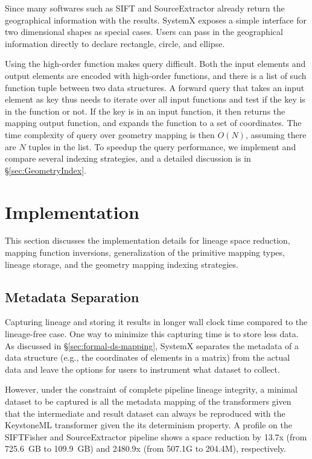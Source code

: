 \documentclass{sig-alternate}
\begin{document}
Since many softwares such as SIFT and SourceExtractor already return the geographical information with the results.
SystemX exposes a simple interface for two dimensional shapes as special cases.
Users can pass in the geographical information directly to declare rectangle, circle, and ellipse.

Using the high-order function makes query difficult. 
Both the input elements and output elements are encoded with high-order functions, 
and there is a list of such function tuple between two data structures.
A forward query that takes an input element as key thus needs to iterate over all input functions and test if the key is in the function or not.
If the key is in an input function, it then returns the mapping output function, and expands the function to a set of coordinates.
The time complexity of query over geometry mapping is then $O(N)$, assuming there are $N$ tuples in the list.
To speedup the query performance, we implement and compare several indexing strategies, and a detailed discussion is in \S\ref{sec:GeometryIndex}.


\section{Implementation}
\label{sec:Impl}
This section discusses the implementation details for lineage space reduction, mapping function inversions, 
generalization of the primitive mapping types, lineage storage, and the geometry mapping indexing strategies.


\subsection{Metadata Separation}
Capturing lineage and storing it results in longer wall clock time compared to the lineage-free case. 
One way to minimize this capturing time is to store less data.
As discussed in \S\ref{sec:formal-ds-mapping}, SystemX separates the metadata of a data structure 
(e.g., the coordinates of elements in a matrix) from the actual data  and leave the options for users to 
instrument what dataset to collect.

However, under the constraint of complete pipeline lineage integrity, a minimal dataset to be captured
is all the metadata mapping of the transformers given that the intermediate and result 
dataset can always be reproduced with the KeystoneML transformer given the its determinism property. 
A profile on the SIFTFisher and SourceExtractor pipeline shows a space reduction by 
13.7x (from 725.6~GB to 109.9~GB) and 2480.9x (from 507.1G to 204.4M), respectively.
\end{document}
